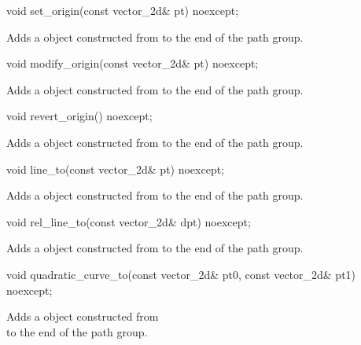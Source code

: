 %
\begin{itemdecl}
void set_origin(const vector_2d& pt) noexcept;
\end{itemdecl}
\begin{itemdescr}
\pnum
\effects
Adds a  object constructed from  to the end of the path group.
\end{itemdescr}

%
\begin{itemdecl}
void modify_origin(const vector_2d& pt) noexcept;
\end{itemdecl}
\begin{itemdescr}
\pnum
\effects
Adds a  object constructed from  to the end of the path group.
\end{itemdescr}

%
\begin{itemdecl}
void revert_origin() noexcept;
\end{itemdecl}
\begin{itemdescr}
\pnum
\effects
Adds a  object constructed from  to the end of the path group.
\end{itemdescr}

%
\begin{itemdecl}
void line_to(const vector_2d& pt) noexcept;
\end{itemdecl}
\begin{itemdescr}
\pnum
Adds a  object constructed from  to the end of the path group.
\end{itemdescr}

%
\begin{itemdecl}
void rel_line_to(const vector_2d& dpt) noexcept;
\end{itemdecl}
\begin{itemdescr}
\pnum
\effects
Adds a  object constructed from  to the end of the path group.
\end{itemdescr}

%
\begin{itemdecl}
void quadratic_curve_to(const vector_2d& pt0, const vector_2d& pt1) noexcept;
\end{itemdecl}
\begin{itemdescr}
\pnum
\effects
Adds a  object constructed from\\  to the end of the path group.
\end{itemdescr}

